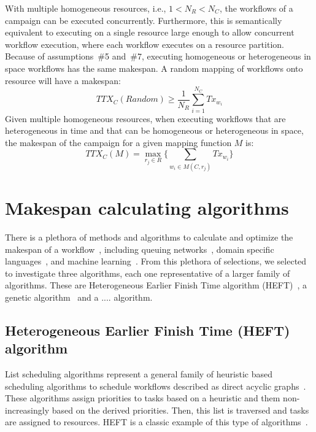 With multiple homogeneous resources, i.e., $1 < N_{R} < N_{C}$, the workflows of a campaign can be executed concurrently.
Furthermore, this is semantically equivalent to executing on a single resource large enough to allow concurrent workflow execution, where each workflow executes on a resource partition. 
Because of assumptions~\#5 and~\#7, executing homogeneous or heterogeneous in space workflows has the same makespan.
A random mapping of workflows onto resource will have a makespan:
\begin{equation}
   TTX_{C}(Random) \geq \frac{1}{N_{R}}\sum_{i=1}^{N_{C}} Tx_{w_{i}} 
\end{equation}
Given multiple homogeneous resources, when executing workflows that are heterogeneous in time and that can be homogeneous or heterogeneous in space, the makespan of the campaign for a given mapping function $ M $ is:
\begin{equation}
TTX_{C}(M) = \max_{r_{j}\in R}\Big\{\sum_{w_{i}\in M(C,r_{j})}Tx_{w_{i}}\Big\}
\label{eq:makespan}
\end{equation}

\section{Makespan calculating algorithms}
\label{sec:algo}

There is a plethora of methods and algorithms to calculate and optimize the makespan of a workflow~\cite{lu2019review}, including queuing networks~\cite{yao2019throughput,bao2019performance}, domain specific languages~\cite{carothers2017durango,maheshwari2016workflow}, and machine learning~\cite{witt2019predictive,pumma2017runtime}.
From this plethora of selections, we selected to investigate three algorithms, each one representative of a larger family of algorithms.
These are Heterogeneous Earlier Finish Time algorithm (HEFT)~\cite{topcuoglu2002performance}, a genetic algorithm~\cite{page2005algorithm} and a .... algorithm.

\subsection{Heterogeneous Earlier Finish Time (HEFT) algorithm}
\label{algo:heft}
List scheduling algorithms represent a general family of heuristic based scheduling algorithms to schedule workflows described as direct acyclic graphs~\cite{dong2006scheduling,list_sched_wiki}. 
These algorithms assign priorities to tasks based on a heuristic and them non-increasingly based on the derived priorities.
Then, this list is traversed and tasks are assigned to resources.
HEFT is a classic example of this type of algorithms~\cite{dong2006scheduling}.

